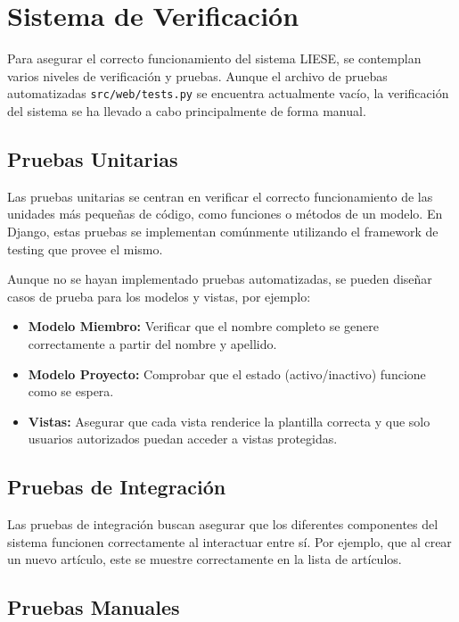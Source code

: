 \chapter{Sistema de Verificación}
\label{ch:sistema_verificacion}

Para asegurar el correcto funcionamiento del sistema LIESE, se contemplan varios niveles de verificación y pruebas. Aunque el archivo de pruebas automatizadas \texttt{src/web/tests.py} se encuentra actualmente vacío, la verificación del sistema se ha llevado a cabo principalmente de forma manual.

\section{Pruebas Unitarias}

Las pruebas unitarias se centran en verificar el correcto funcionamiento de las unidades más pequeñas de código, como funciones o métodos de un modelo. En Django, estas pruebas se implementan comúnmente utilizando el framework de testing que provee el mismo.

Aunque no se hayan implementado pruebas automatizadas, se pueden diseñar casos de prueba para los modelos y vistas, por ejemplo:
\begin{itemize}
    \item \textbf{Modelo Miembro:} Verificar que el nombre completo se genere correctamente a partir del nombre y apellido.
    \item \textbf{Modelo Proyecto:} Comprobar que el estado (activo/inactivo) funcione como se espera.
    \item \textbf{Vistas:} Asegurar que cada vista renderice la plantilla correcta y que solo usuarios autorizados puedan acceder a vistas protegidas.
\end{itemize}

\section{Pruebas de Integración}

Las pruebas de integración buscan asegurar que los diferentes componentes del sistema funcionen correctamente al interactuar entre sí. Por ejemplo, que al crear un nuevo artículo, este se muestre correctamente en la lista de artículos.

\section{Pruebas Manuales}

